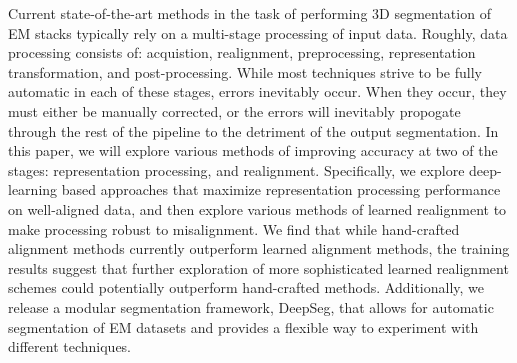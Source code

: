 Current state-of-the-art methods in the task of performing 3D segmentation of EM stacks typically rely on a multi-stage processing of input data. Roughly, data processing consists of: acquistion, realignment, preprocessing, representation transformation, and post-processing. While most techniques strive to be fully automatic in each of these stages, errors inevitably occur. When they occur, they must either be manually corrected, or the errors will inevitably propogate through the rest of the pipeline to the detriment of the output segmentation. In this paper, we will explore various methods of improving accuracy at two of the stages: representation processing, and realignment. Specifically, we explore deep-learning based approaches that maximize representation processing performance on well-aligned data, and then explore various methods of learned realignment to make processing robust to misalignment. We find that while hand-crafted alignment methods currently outperform learned alignment methods, the training results suggest that further exploration of more sophisticated learned realignment schemes could potentially outperform hand-crafted methods. Additionally, we release a modular segmentation framework, DeepSeg, that allows for automatic segmentation of EM datasets and provides a flexible way to experiment with different techniques.